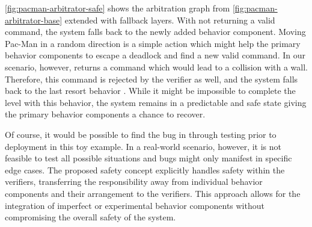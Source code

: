 \cref{fig:pacman-arbitrator-safe} shows the arbitration graph from \cref{fig:pacman-arbitrator-base} extended with fallback layers.
With  not returning a valid command, the system falls back to the newly added  behavior component.
Moving Pac-Man in a random direction is a simple action which might help the primary behavior components to escape a deadlock and find a new valid command.
In our scenario, however,  returns a command which would lead to a collision with a wall.
Therefore, this command is rejected by the verifier as well, and the system falls back to the last resort behavior .
While it might be impossible to complete the level with this behavior, the system remains in a predictable and safe state giving the primary behavior components a chance to recover.

Of course, it would be possible to find the bug in  through testing prior to deployment in this toy example.
In a real-world scenario, however, it is not feasible to test all possible situations and bugs might only manifest in specific edge cases.
The proposed safety concept explicitly handles safety within the verifiers, transferring the responsibility away from individual behavior components and their arrangement to the verifiers.
This approach allows for the integration of imperfect or experimental behavior components without compromising the overall safety of the system.

